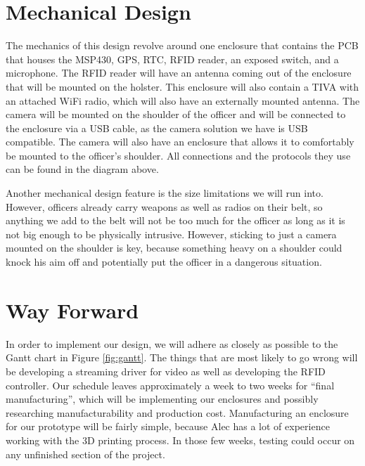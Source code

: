 \documentclass[12pt]{article}
\begin{document}
\section{Mechanical Design}
The mechanics of this design revolve around one enclosure that contains the PCB
that houses the MSP430, GPS, RTC, RFID reader, an exposed switch, and a
microphone. The RFID reader will have an antenna coming out of the enclosure
that will be mounted on the holster. This enclosure will also contain a TIVA
with an attached WiFi radio, which will also have an externally mounted
antenna. The camera will be mounted on the shoulder of the officer and will be
connected to the enclosure via a USB cable, as the camera solution we have is
USB compatible. The camera will also have an enclosure that allows it to
comfortably be mounted to the officer's shoulder. All connections and the
protocols they use can be found in the diagram above.

Another mechanical design feature is the size limitations we will run into.
However, officers already carry weapons as well as radios on their belt, so
anything we add to the belt will not be too much for the officer as long as it
is not big enough to be physically intrusive. However, sticking to just a
camera mounted on the shoulder is key, because something heavy on a shoulder
could knock his aim off and potentially put the officer in a dangerous
situation. 

\section{Way Forward}
In order to implement our design, we will adhere as closely as possible to the
Gantt chart in Figure \ref{fig:gantt}. The things that are most likely to go
wrong will be developing a streaming driver for video as well as developing the
RFID controller. Our schedule leaves approximately a week to two weeks for
``final manufacturing'', which will be implementing our enclosures and possibly
researching manufacturability and production cost. Manufacturing an enclosure
for our prototype will be fairly simple, because Alec has a lot of experience
working with the 3D printing process. In those few weeks, testing could occur
on any unfinished section of the project. 
\end{document}
